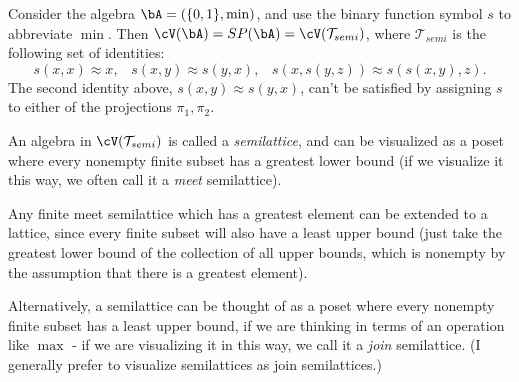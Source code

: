 \begin{ex} Consider the algebra $\bA = (\{0,1\}, \min)$, and use the binary function symbol $s$ to abbreviate $\min$. Then $\cV(\bA) = SP(\bA) = \cV(\mathcal{T}_{semi})$, where $\mathcal{T}_{semi}$ is the following set of identities:
\[
s(x,x) \approx x, \;\;\; s(x,y) \approx s(y,x), \;\;\; s(x,s(y,z)) \approx s(s(x,y),z).
\]
The second identity above, $s(x,y) \approx s(y,x)$, can't be satisfied by assigning $s$ to either of the projections $\pi_1, \pi_2$.

An algebra in $\cV(\mathcal{T}_{semi})$ is called a \emph{semilattice}, and can be visualized as a poset where every nonempty finite subset has a greatest lower bound (if we visualize it this way, we often call it a \emph{meet} semilattice).

Any finite meet semilattice which has a greatest element can be extended to a lattice, since every finite subset will also have a least upper bound (just take the greatest lower bound of the collection of all upper bounds, which is nonempty by the assumption that there is a greatest element).

Alternatively, a semilattice can be thought of as a poset where every nonempty finite subset has a least upper bound, if we are thinking in terms of an operation like $\max$ - if we are visualizing it in this way, we call it a \emph{join} semilattice. (I generally prefer to visualize semilattices as join semilattices.)
\end{ex}


